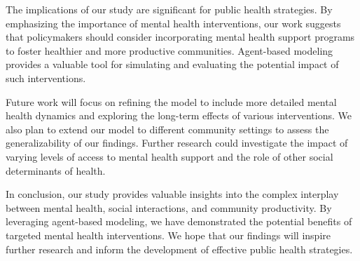 \documentclass{article} %
\begin{document}
The implications of our study are significant for public health strategies. By emphasizing the importance of mental health interventions, our work suggests that policymakers should consider incorporating mental health support programs to foster healthier and more productive communities. Agent-based modeling provides a valuable tool for simulating and evaluating the potential impact of such interventions.

Future work will focus on refining the model to include more detailed mental health dynamics and exploring the long-term effects of various interventions. We also plan to extend our model to different community settings to assess the generalizability of our findings. Further research could investigate the impact of varying levels of access to mental health support and the role of other social determinants of health.

In conclusion, our study provides valuable insights into the complex interplay between mental health, social interactions, and community productivity. By leveraging agent-based modeling, we have demonstrated the potential benefits of targeted mental health interventions. We hope that our findings will inspire further research and inform the development of effective public health strategies.



\end{document}
